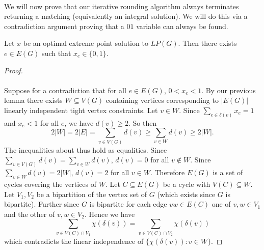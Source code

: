 \paragraph{} We will now prove that our iterative rounding algorithm always terminates returning a matching (equivalently an integral solution). We will do this via a contradiction argument proving that a $01$ variable can always be found.
\begin{lemma} Let $x$ be an optimal extreme point solution to $LP(G)$. Then there exists $e \in E(G)$ such that $x_e \in \{0,1\}$.
\end{lemma}
\begin{proof}
\paragraph{}
Suppose for a contradiction that for all $e\in E(G)$, $0 < x_e < 1$. By our previous lemma there exists $W \subseteq V(G)$ containing vertices corresponding to $|E(G)|$ linearly independent tight vertex constraints. Let $v \in W$. Since $\sum_{e\in \delta(v)} x_e = 1$ and $x_e < 1$ for all $e$, we have $d(v) \geq 2$. So then
$$2|W| = 2|E| = \sum_{v \in V(G)} d(v) \geq \sum_{v\in W} d(v) \geq 2|W|.$$
The inequalities about thus hold as equalities. Since $\sum_{v\in V(G)} d(v) = \sum_{v \in W} d(v)$, $d(v) = 0$ for all $v \not\in W$. Since $\sum_{v \in W} d(v) = 2|W|$, $d(v) = 2$ for all $v \in W$. Therefore $E(G)$ is a set of cycles covering the vertices of $W$. Let $C \subseteq E(G)$ be a cycle with $V(C) \subseteq W$. Let $V_1, V_2$ be a bipartition of the vertex set of $G$ (which exists since $G$ is bipartite). Further since $G$ is bipartite for each edge $vw \in E(C)$ one of $v,w \in V_1$ and the other of $v,w \in V_2$. Hence we have
$$\sum_{v \in V(C) \cap V_1} \chi(\delta(v)) = \sum_{v\in V(C) \cap V_2} \chi(\delta(v))$$
which contradicts the linear independence of $\{\chi(\delta(v)) : v \in W\}$.
\end{proof}
